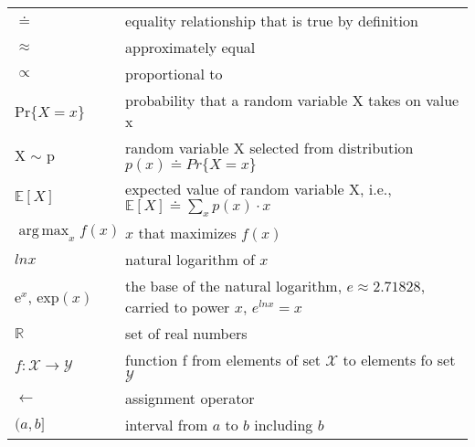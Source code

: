 \documentclass[8pt, landscape]{article}
\DeclareMathOperator*{\argmax}{arg\,max}
\begin{document}
\begin{multicols}{3}
        \begin{tabular}{ p{} p{} }
            $\doteq$                                 & equality relationship that is true by definition                                          \\
            $\approx$                                & approximately equal                                                                       \\
            $\propto$                                & proportional to                                                                           \\
            Pr$\{X=x\}$                              & probability that a random variable X takes on value x                                     \\
            X $\sim$ p                               & random variable X selected from distribution $p(x)\doteq Pr\{X=x\}$                       \\
            $\mathbb{E}[X]$                          & expected value of random variable X, i.e., $\mathbb{E}[X]\doteq \sum_{x}p(x)\cdot x$      \\
            $\argmax_{x} f(x)$                       & $x$ that maximizes $f(x)$                                                                 \\
            $ln x$                                   & natural logarithm of $x$                                                                  \\
            $\mathrm{e}^x$, $\mathrm{exp}(x)$        & the base of the natural logarithm, $e\approx 2.71828$, carried to power $x$, $e^{ln x}=x$ \\
            $\mathbb{R}$                             & set of real numbers                                                                       \\
            $f: \mathcal{X} \rightarrow \mathcal{Y}$ & function f from elements of set $\mathcal{X}$ to elements fo set $\mathcal{Y}$            \\
            $\leftarrow$                             & assignment operator                                                                       \\
            $(a,b]$                                  & interval from $a$ to $b$ including $b$                                                    \\
        \end{tabular}


\end{multicols}
\end{document}

